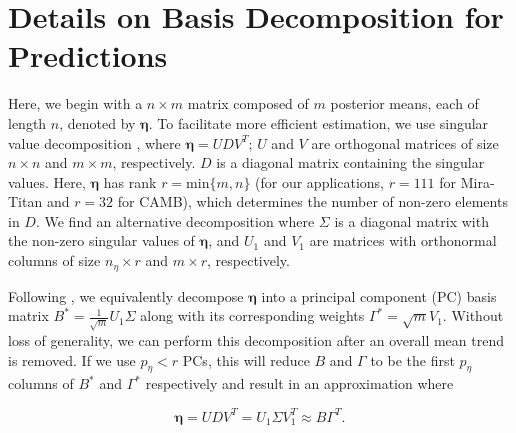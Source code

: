 \documentclass[11pt]{article}
\begin{document}
\section{Details on Basis Decomposition for Predictions}
\label{sec:apdx_basis}

Here, we begin with a $n \times m$ matrix composed of $m$ posterior means, 
each of length $n$, denoted by $\boldsymbol\eta$. To facilitate more efficient estimation, 
we use singular value decomposition \citep[SVD; e.g.,][]{banerjee2014linear}, 
where $\boldsymbol\eta = UDV^T$; $U$ and $V$ are orthogonal matrices of size $n \times n$ 
and $m\times m$, respectively. $D$ is a diagonal matrix containing the singular values. 
Here, $\boldsymbol\eta$ has rank $r=\text{min}\{m,n\}$ (for our applications, $r=111$ for Mira-Titan 
and $r=32$ for CAMB), which determines the number of non-zero elements in $D$. We find an alternative 
decomposition where $\Sigma$ is a diagonal matrix with the non-zero singular values of 
$\boldsymbol\eta$, and $U_1$ and $V_1$ are matrices with orthonormal columns of size 
$n_\eta \times r$ and $m \times r$, respectively. 

Following \cite{higdon2008computer, higdon2010estcosmo}, we equivalently decompose 
$\boldsymbol\eta$ into a principal component (PC) basis matrix 
$B^* = \frac{1}{\sqrt{m}}U_1\Sigma$ along with its corresponding weights 
$\Gamma^* = \sqrt{m}V_1$. Without loss of generality, we can perform this decomposition 
after an overall mean trend is removed. If we use $p_\eta < r$ PCs, this will reduce 
$B$ and $\Gamma$ to be the first $p_\eta$ columns of $B^*$ and $\Gamma^*$ respectively and 
result in an approximation where 

\begin{equation}
    \boldsymbol\eta= UDV^T = U_1\Sigma V_1^T \approx B\Gamma^T.
\end{equation}



\end{document}
